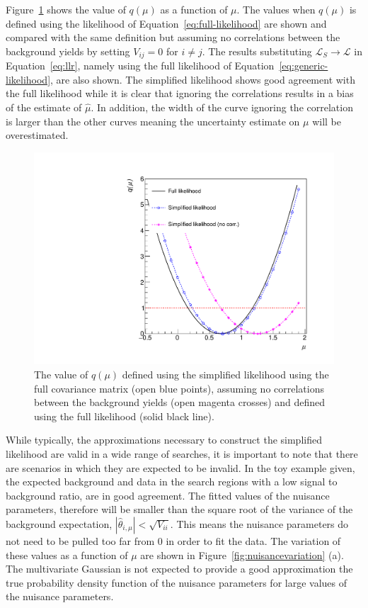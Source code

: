 Figure~\ref{fig:likelihoodscan} shows the value of $q(\mu)$ as a function of $\mu$. The values when $q(\mu)$ 
is defined using the likelihood of Equation~\ref{eq:full-likelihood} are shown and compared with the same definition but assuming no correlations between the 
background yields by setting $V_{ij}=0$ for $i\neq j$. The results substituting $\mathcal{L}_{S}\rightarrow\mathcal{L}$ in Equation~\ref{eq:llr}, 
namely using the full likelihood of Equation~\ref{eq:generic-likelihood}, are also shown. The simplified 
likelihood shows good agreement with the full likelihood while it is clear that ignoring the correlations results in a bias of the estimate of $\hat{\mu}$. In 
addition, the width of the curve ignoring the correlation is larger than the other curves meaning the uncertainty estimate on $\mu$ will be overestimated.  


\begin{figure}[hbt]
  \begin{center} 
   \includegraphics[width=1.5\cmsFigWidth]{figures/r.pdf}
   \caption{The value of $q(\mu)$ defined using the simplified likelihood using the full covariance matrix (open blue points), assuming no correlations between the 
   background yields (open magenta crosses) and defined using the full likelihood (solid black line).}
   \label{fig:likelihoodscan} 
  \end{center}
\end{figure}


While typically, the approximations necessary to construct the simplified likelihood are valid in a wide range of searches, 
it is important to note that there are scenarios in which they are expected to be invalid. 
In the toy example given, the expected background and data in the search regions with a low signal to background ratio, are in good agreement. 
The fitted values of the nuisance parameters, therefore will be smaller than the square root of the variance of the 
background expectation,  $|\hat{\theta}_{i,\mu}| \lt \sqrt{V_{ii}}$. This means the nuisance parameters do not need to be pulled too far from 0 in order to  
fit the data. The variation of these values as a function of $\mu$ are shown in Figure~\ref{fig:nuisancevariation} (a). 
The multivariate Gaussian is not expected to provide a good approximation the true probability density function of the nuisance parameters for 
large values of the nuisance parameters.

